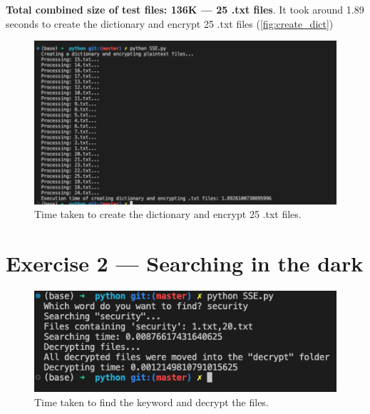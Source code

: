 \documentclass{article}
\begin{document}
\textbf{Total combined size of test files: 136K --- 25 .txt files}.
It took around 1.89 seconds to create the dictionary and encrypt
25 .txt files (\autoref{fig:create_dict})

\begin{figure}
    \centering
    \includegraphics[height=\textheight,width=\textwidth,
    keepaspectratio]{create_dict_time_printing_included.png}
    \caption{Time taken to create the dictionary and encrypt 25 .txt files.}
    \label{fig:create_dict}
\end{figure}

\section*{Exercise 2 --- Searching in the dark}

\begin{figure}
    \centering
    \includegraphics[height=\textheight,width=\textwidth,
    keepaspectratio]{searching_decrypting_time.png}
    \caption{Time taken to find the keyword and decrypt the files.}
\end{figure}
\end{document}
